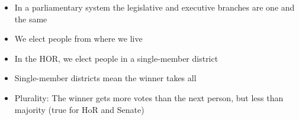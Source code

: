 \documentclass[12pt]{article}
\begin{document}
\begin{itemize}
  \item In a parliamentary system the legislative and executive branches are one and the same

  \item We elect people from where we live

  \item In the HOR, we elect people in a single-member district

  \item Single-member districts mean the winner takes all

  \item Plurality: The winner gets more votes than the next person, but less than majority (true for HoR and Senate)

\end{itemize}
\end{document}
